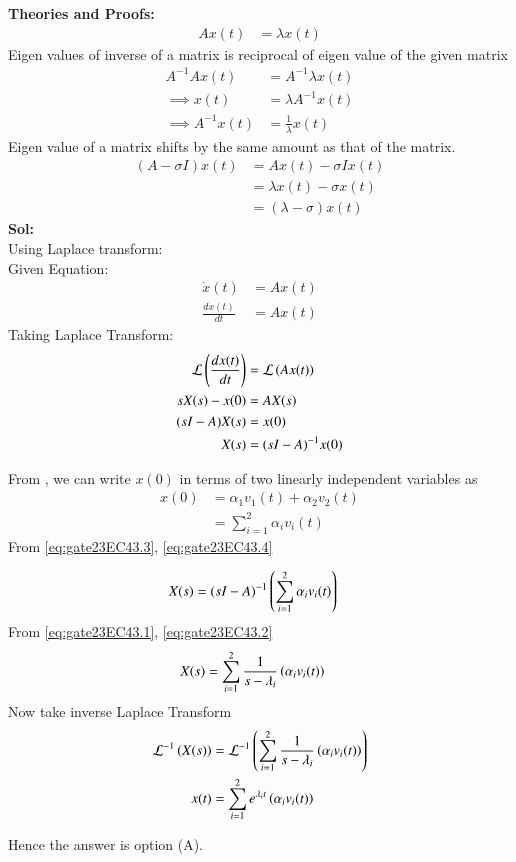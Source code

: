 \documentclass[journal,12pt,onecolumn]{IEEEtran}
\theoremstyle{remark}
\begin{document}
\textbf{Theories and Proofs:} \\
\begin{align}
Ax(t) &= \lambda x(t) 
\end{align}
Eigen values of inverse of a matrix is reciprocal of eigen value of the given matrix\\
\begin{align}
A^{-1}Ax(t) &= A^{-1}\lambda x(t) \\ \implies
x(t) &= \lambda A^{-1}x(t)  \\ \implies
A^{-1} x(t) &= \frac{1}{\lambda}x(t) \label{eq:gate23EC43.1}
\end{align}
Eigen value of a matrix shifts by the same amount as that of the matrix.\\
\begin{align}
(A - \sigma I)x(t) &= Ax(t) - \sigma Ix(t) \\
&= \lambda x(t) - \sigma x(t) \\
&= (\lambda - \sigma) x(t) \label{eq:gate23EC43.2}
\end{align}
\textbf{Sol:} \\
Using Laplace transform: \\
Given Equation:
\begin{align}
\dot{{x}}(t) &= A{x}(t) \\
\frac{d{x}(t)}{dt} &= A{x}(t) 
\end{align}
Taking Laplace Transform:
\begin{align}
\mathcal{L}\brak{\frac{d{x}(t)}{dt}} &= \mathcal{L}\brak{A{x}(t)} \\
sX(s) - {x}(0) &= AX(s) \\
(sI - A)X(s) &= x(0) \\
X(s) &= (sI - A)^{-1}{x}(0) \label{eq:gate23EC43.3}
\end{align}

From , we can write $x(0)$ in terms of two linearly independent variables as 
\begin{align}
    x(0) &= \alpha_1v_1(t) + \alpha_2v_2(t) \\
    &= \sum_{i=1}^{2}\alpha_iv_i(t) \label{eq:gate23EC43.4}
\end{align}
From \eqref{eq:gate23EC43.3}, \eqref{eq:gate23EC43.4}

\begin{align}
 X(s) &= (sI - A)^{-1}\left(\sum_{i=1}^{2}\alpha_iv_i(t)\right) 
\end{align}
From \eqref{eq:gate23EC43.1}, \eqref{eq:gate23EC43.2}
\begin{align}
X(s) &=  \sum_{i=1}^{2}\frac{1}{s-\lambda_i}\left(\alpha_iv_i(t)\right)
\end{align}
Now take inverse Laplace Transform
\begin{align}
\mathcal{L}^{-1}\left(X(s)\right) &= \mathcal{L}^{-1}\left(\sum_{i=1}^{2}\frac{1}{s-\lambda_i}\left(\alpha_iv_i(t)\right)\right) \\
{x}(t) &= \sum_{i=1}^{2} e^{\lambda_it}\left(\alpha_iv_i(t)\right) 
\end{align}

Hence the answer is option (A).
\end{document}
